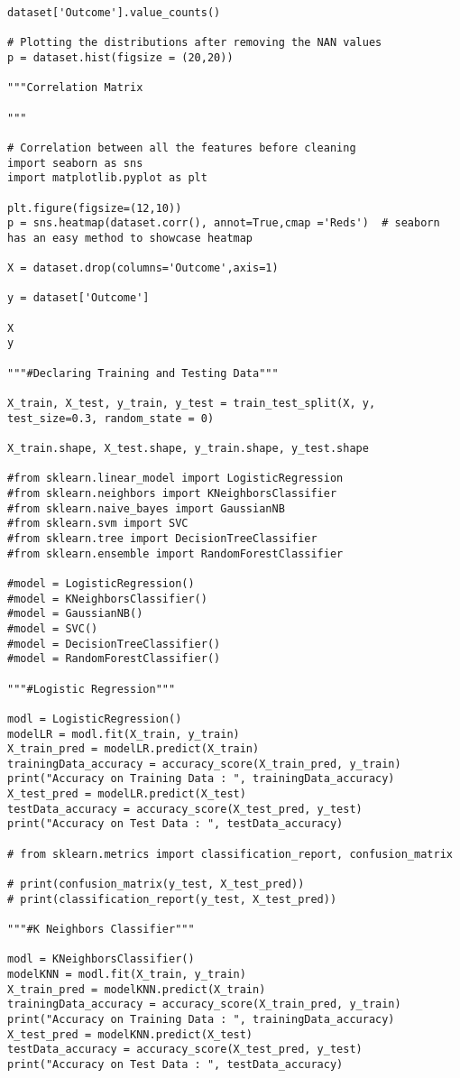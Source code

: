 \documentclass[pdftex,a4paper,11pt,oneside,openright]{report}
\begin{document}
\begin{lstlisting}
dataset['Outcome'].value_counts()

# Plotting the distributions after removing the NAN values
p = dataset.hist(figsize = (20,20))

"""Correlation Matrix

"""

# Correlation between all the features before cleaning
import seaborn as sns
import matplotlib.pyplot as plt

plt.figure(figsize=(12,10))
p = sns.heatmap(dataset.corr(), annot=True,cmap ='Reds')  # seaborn has an easy method to showcase heatmap

X = dataset.drop(columns='Outcome',axis=1)

y = dataset['Outcome']

X
y

"""#Declaring Training and Testing Data"""

X_train, X_test, y_train, y_test = train_test_split(X, y, test_size=0.3, random_state = 0)

X_train.shape, X_test.shape, y_train.shape, y_test.shape

#from sklearn.linear_model import LogisticRegression
#from sklearn.neighbors import KNeighborsClassifier
#from sklearn.naive_bayes import GaussianNB
#from sklearn.svm import SVC
#from sklearn.tree import DecisionTreeClassifier
#from sklearn.ensemble import RandomForestClassifier

#model = LogisticRegression()
#model = KNeighborsClassifier()
#model = GaussianNB()
#model = SVC()
#model = DecisionTreeClassifier()
#model = RandomForestClassifier()

"""#Logistic Regression"""

modl = LogisticRegression()
modelLR = modl.fit(X_train, y_train)
X_train_pred = modelLR.predict(X_train)
trainingData_accuracy = accuracy_score(X_train_pred, y_train)
print("Accuracy on Training Data : ", trainingData_accuracy)
X_test_pred = modelLR.predict(X_test)
testData_accuracy = accuracy_score(X_test_pred, y_test)
print("Accuracy on Test Data : ", testData_accuracy)

# from sklearn.metrics import classification_report, confusion_matrix

# print(confusion_matrix(y_test, X_test_pred))
# print(classification_report(y_test, X_test_pred))

"""#K Neighbors Classifier"""

modl = KNeighborsClassifier()
modelKNN = modl.fit(X_train, y_train)
X_train_pred = modelKNN.predict(X_train)
trainingData_accuracy = accuracy_score(X_train_pred, y_train)
print("Accuracy on Training Data : ", trainingData_accuracy)
X_test_pred = modelKNN.predict(X_test)
testData_accuracy = accuracy_score(X_test_pred, y_test)
print("Accuracy on Test Data : ", testData_accuracy)


\end{lstlisting}
\end{document}
